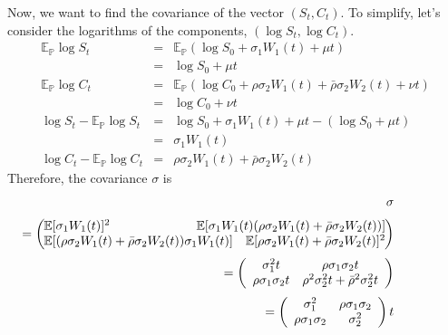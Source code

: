 \documentclass[uplatex,a4j,12pt,dvipdfmx]{jsarticle}
\begin{document}
Now, we want to find the covariance of the vector $(S_{t},C_{t})$.
To simplify, let's consider the logarithms of the components, $(\log S_{t},\log C_{t})$.
%
%
\begin{eqnarray*}
	\mathbb{E}_{\mathbb{P}} \log S_{t}
	&=&
	\mathbb{E}_{\mathbb{P}} (\log S_{0} + \sigma_{1} W_{1}(t) + \mu t)
	\\
	&=&
	\log S_{0} + \mu t
	\\
	\mathbb{E}_{\mathbb{P}} \log C_{t}
	&=&
	\mathbb{E}_{\mathbb{P}} (\log C_{0} + \rho \sigma_{2} W_{1}(t) + \bar{\rho} \sigma_{2} W_{2}(t) + \nu t)
	\\
	&=&
	\log C_{0} + \nu t
	\\
	\log S_{t} - \mathbb{E}_{\mathbb{P}} \log S_{t}
	&=&
	\log S_{0} + \sigma_{1} W_{1}(t) + \mu t
	-
	(\log S_{0} + \mu t)
	\\
	&=&
	\sigma_{1} W_{1}(t)
	\\
	\log C_{t} - \mathbb{E}_{\mathbb{P}} \log C_{t}
	&=&
	\rho \sigma_{2} W_{1}(t) + \bar{\rho} \sigma_{2} W_{2}(t)
\end{eqnarray*}
%
%
Therefore, the covariance $\mathbb{\sigma}$ is
%
%
\begin{eqnarray*}
	&&
	\hspace{-10mm} \mathbb{\sigma}
	\\[1mm] && \hspace{-20mm} \ =
	\left(
	\hspace{-2mm}
	\begin{array}{lr}
		\mathbb{E}[\sigma_{1} W_{1}(t)]^{2}
		 &
		\hspace{-20mm}
		\mathbb{E}[\sigma_{1} W_{1}(t) (\rho \sigma_{2} W_{1}(t) + \bar{\rho} \sigma_{2} W_{2}(t))]
		\\
		\mathbb{E}[(\rho \sigma_{2} W_{1}(t) + \bar{\rho} \sigma_{2} W_{2}(t))\sigma_{1} W_{1}(t)]
		 &
		\mathbb{E}[\rho \sigma_{2} W_{1}(t) + \bar{\rho} \sigma_{2} W_{2}(t)]^{2}
	\end{array}
	\hspace{-2mm}
	\right)
	\\[1mm] && \hspace{-20mm} \ =
	\left(
	\begin{array}{cc}
			\sigma_{1}^{2} t             & \rho \sigma_{1} \sigma_{2} t
			\\
			\rho \sigma_{1} \sigma_{2} t & \rho^{2} \sigma_{2}^{2} t + \bar{\rho}^{2} \sigma^{2}_{2} t
		\end{array}
	\right)
	\\[1mm] && \hspace{-20mm} \ =
	\left(
	\begin{array}{cc}
			\sigma_{1}^{2}             & \rho \sigma_{1} \sigma_{2}
			\\
			\rho \sigma_{1} \sigma_{2} & \sigma^{2}_{2}
		\end{array}
	\right)
	t
\end{eqnarray*}
\end{document}
